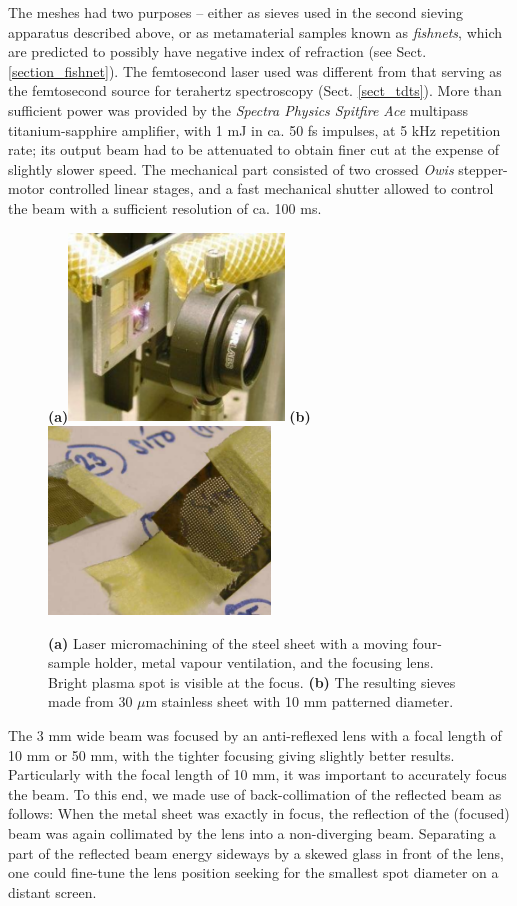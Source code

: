 The meshes had two purposes -- either as sieves used in the second sieving apparatus described above, or as metamaterial samples known as \textit{fishnets}, which are predicted to possibly have negative index of refraction (see Sect. \ref{section_fishnet}). 
The femtosecond laser used was different from that serving as the femtosecond source for terahertz spectroscopy (Sect. \ref{sect_tdts}). More than sufficient power was provided by the \textit{Spectra Physics Spitfire Ace} multipass titanium-sapphire amplifier, with 1 mJ in ca. 50 fs impulses, at 5 kHz repetition rate; its output beam had to be attenuated to obtain finer cut at the expense of slightly slower speed. The mechanical part consisted of two crossed \textit{Owis} stepper-motor controlled linear stages, and a fast mechanical shutter allowed to control the beam with a sufficient resolution of ca. 100 ms. 
\begin{figure}[ht] \caption{\textbf{(a)} Laser micromachining of the steel sheet with a moving four-sample holder, metal vapour ventilation, and the focusing lens. Bright plasma spot is visible at the focus. \textbf{(b)} The resulting sieves made from 30 $\mu$m stainless sheet with 10 mm patterned diameter.} \label{fg_microfab} \centering 
\textbf{(a)}\includegraphics[height=5cm]{img/technology/sieve2_drilling_m.pdf}
\textbf{(b)}\includegraphics[height=5cm]{img/technology/steel_sieve_on_paper.pdf}
\end{figure}

The 3 mm wide beam was focused by an anti-reflexed lens with a focal length of 10 mm or 50 mm, with the tighter focusing giving slightly better results. Particularly with the focal length of 10 mm, it was important to accurately focus the beam. To this end, we made use of back-collimation of the reflected beam as follows: When the metal sheet was exactly in focus, the reflection of the (focused) beam was again collimated by the lens into a non-diverging beam. Separating a part of the reflected beam energy sideways by a skewed glass in front of the lens, one could fine-tune the lens position seeking for the smallest spot diameter on a distant screen.

